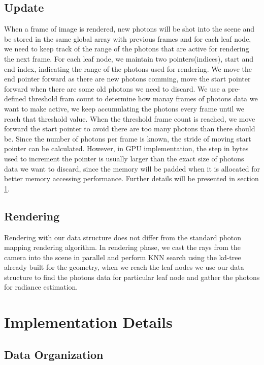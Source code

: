 \subsection{Update} 

When a frame of image is rendered, new photons will be shot into the scene and be stored in the same global array with previous frames and for each leaf node, we need to keep track of the range of the photons that are active for rendering the next frame. For each leaf node, we maintain two pointers(indices), start and end index, indicating the range of the photons used for rendering. We move the end pointer forward as there are new photons comming, move the start pointer forward when there are some old photons we need to discard. We use a pre-defined threshold fram count to determine how manay frames of photons data we want to make active, we keep accumulating the photons every frame until we reach that threshold value. When the threshold frame count 
is reached, we move forward the start pointer to avoid there are too many photons than there should be. Since the number of photons per frame is known, the stride of moving start pointer can be calculated. However, in GPU implementation, the step in bytes used to increment the pointer is usually larger than the exact size of photons data we want to discard, since the memory will be padded when it is allocated for better memory accessing performance. Further details will be presented in section \ref{sec:impl_detials}. 

\subsection{Rendering} 

Rendering with our data structure does not differ from the standard photon mapping rendering algorithm. In rendering phase, we cast the rays from the camera into the scene in parallel and perform KNN search using the kd-tree already built for the geometry, when we reach the leaf nodes we use our data structure to find the photons data for particular leaf node and gather the photons for radiance estimation. 

\section{Implementation Details} 
\label{sec:impl_detials} 

\subsection{Data Organization}

